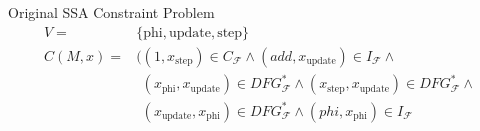 \centering
\begin{blackwhitebox}{Original SSA Constraint Problem}
    \setlength{\abovedisplayskip}{0pt}
    \setlength{\belowdisplayskip}{0pt}
    \vspace{-0.5em}
\begin{align*}
        V={}&\{\text{phi}, \text{update}, \text{step}\}\\
        C(M,x)={}&    ((1,x_\text{step})
                        \in C_\mathcal{F}\mathrel\land
                       (add,x_\text{update})
                        \in I_\mathcal{F}\mathrel\land\\
           &\phantom{(}(x_\text{phi},x_\text{update})
                        \in DFG_\mathcal{F}^*\mathrel\land
                       (x_\text{step},x_\text{update})
                        \in DFG_\mathcal{F}^*\mathrel\land\\
           &\phantom{(}(x_\text{update},x_\text{phi})
                        \in DFG_\mathcal{F}^*\mathrel\land
                       (phi,x_\text{phi})
                        \in I_\mathcal{F}
    \end{align*}
\end{blackwhitebox}

